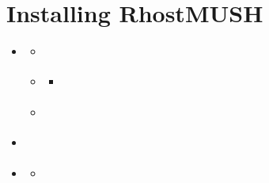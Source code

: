 \documentclass[letterpaper,10pt,english]{sphinxmanual}
\begin{document}
\chapter{Installing RhostMUSH}
\label{\detokenize{install:installing-rhostmush}}\label{\detokenize{install:id1}}\label{\detokenize{install::doc}}
\begin{sphinxShadowBox}
\begin{itemize}
\item {} 
\sphinxAtStartPar
{}\label{\detokenize{install:id9}}{\hyperref[\detokenize{install:rhostmush-requirements}]{}}
\begin{itemize}
\item {} 
\sphinxAtStartPar
{}\label{\detokenize{install:id10}}{\hyperref[\detokenize{install:system-requirements}]{}}

\item {} 
\sphinxAtStartPar
{}\label{\detokenize{install:id11}}{\hyperref[\detokenize{install:software-requirements}]{}}
\begin{itemize}
\item {} 
\sphinxAtStartPar
{}\label{\detokenize{install:id12}}{\hyperref[\detokenize{install:optional-packages}]{}}

\end{itemize}

\item {} 
\sphinxAtStartPar
{}\label{\detokenize{install:id13}}{\hyperref[\detokenize{install:hosting-requirements}]{}}

\end{itemize}

\item {} 
\sphinxAtStartPar
{}\label{\detokenize{install:id14}}{\hyperref[\detokenize{install:obtaining-rhostmush-source-code}]{}}

\item {} 
\sphinxAtStartPar
{}\label{\detokenize{install:id15}}{\hyperref[\detokenize{install:options-for-making-a-mush}]{}}
\begin{itemize}
\item {} 
\sphinxAtStartPar
{}\label{\detokenize{install:id16}}{\hyperref[\detokenize{install:compile-time-options}]{}}


\end{itemize}
\end{itemize}
\end{sphinxShadowBox}
\end{document}
